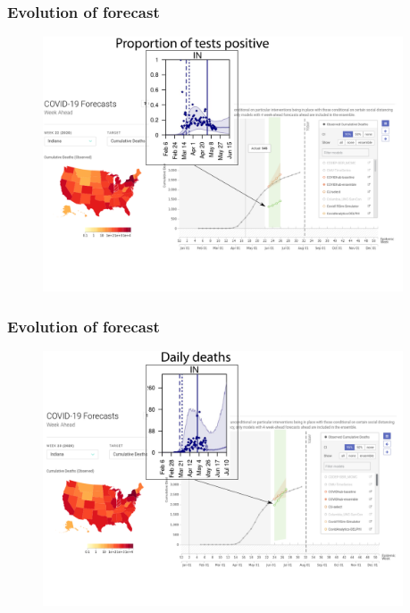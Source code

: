 \documentclass[usenames,dvipsnames]{beamer}
\begin{document}
\begin{frame}
  \frametitle{Evolution of forecast}
    \begin{figure}
    \includegraphics[width=0.95\textwidth]{./images/FRED_forecast_up_4.png}
  \end{figure}
\end{frame}

\begin{frame}
  \frametitle{Evolution of forecast}
    \begin{figure}
    \includegraphics[width=0.95\textwidth]{./images/FRED_forecast_up_5.png}
  \end{figure}
\end{frame}
\end{document}
